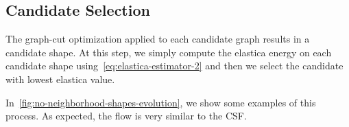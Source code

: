 \documentclass[review]{siamart220329}
\begin{document}
\subsection{Candidate Selection}
%
%
The graph-cut optimization applied to each candidate graph results in a candidate shape. At this step, we simply compute the elastica energy on each 
candidate shape using~\cref{eq:elastica-estimator-2} and then we select the candidate with lowest elastica value.


In~\cref{fig:no-neighborhood-shapes-evolution}, we show some examples of this process. As expected, the flow is very similar to the CSF. 
%
%
%
\end{document}
